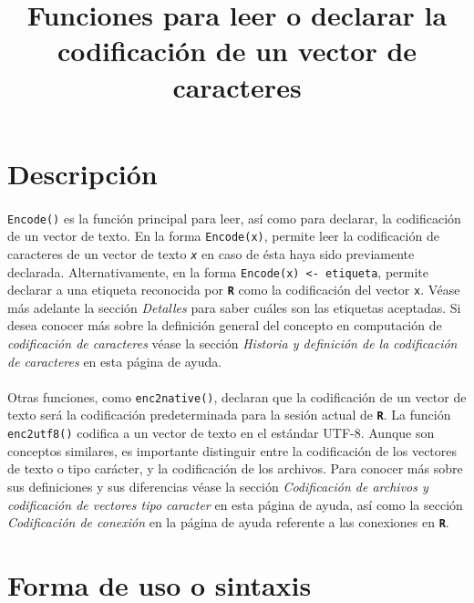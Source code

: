 \documentclass{article}[letter, 12pt]
\makeatletter
\def\code#1{\texttt{#1}}
\def\codename#1{\textbf{\texttt{\color{gray}#1}}}
\renewcommand{\maketitle}{\bgroup\setlength{\parindent}{0pt}
\begin{flushleft}
  \textbf{\@title}
  \@author
\end{flushleft}\egroup
}
\makeatother
\begin{document}
	\title{\Huge{Funciones para leer o declarar la codificación de un vector de caracteres}}
	\maketitle
\section{\color{gray}Descripción}
\paragraph{}\code{Encode()} es la función principal para leer, así como para declarar, la codificación de un vector de texto. En la forma \code{Encode(x)}, permite leer la codificación de caracteres de un vector de texto \textit{\code{x}} en caso de ésta haya sido previamente declarada. Alternativamente, en la forma \code{Encode(x) <- etiqueta}, permite declarar a una etiqueta reconocida por \codename{R} como la codificación del vector \code{x}. Véase más adelante la sección \textit{Detalles} para saber cuáles son las etiquetas aceptadas. Si desea conocer más sobre la definición general del concepto en computación de \textit{codificación de caracteres} véase la sección \textit{Historia y definición de la codificación de caracteres} en esta página de ayuda.\par
\paragraph{}Otras funciones, como \code{enc2native()}, declaran que la codificación de un vector de texto será la codificación predeterminada para la sesión actual de \codename{R}. La función \code{enc2utf8()} codifica a un vector de texto en el estándar UTF-8. Aunque son conceptos similares, es importante distinguir entre la codificación de los vectores de texto o tipo carácter, y la codificación de los archivos. Para conocer más sobre sus definiciones y sus diferencias véase la sección \textit{Codificación de archivos y codificación de vectores tipo caracter} en esta página de ayuda, así como la sección \textit{Codificación de conexión} en la página de ayuda referente a las conexiones en \codename{R}.\par
\tableofcontents{}
\section{\color{gray}Forma de uso o sintaxis}
\end{document}
